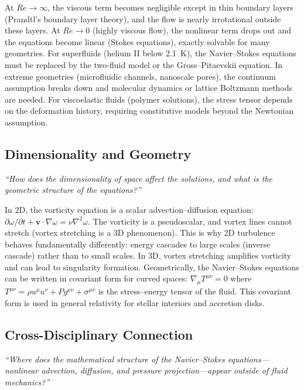 At $Re \to \infty$, the viscous term becomes negligible except in thin boundary layers (Prandtl's boundary layer theory), and the flow is nearly irrotational outside these layers. At $Re \to 0$ (highly viscous flow), the nonlinear term drops out and the equations become linear (Stokes equations), exactly solvable for many geometries. For superfluids (helium II below 2.1~K), the Navier--Stokes equations must be replaced by the two-fluid model or the Gross--Pitaevskii equation. In extreme geometries (microfluidic channels, nanoscale pores), the continuum assumption breaks down and molecular dynamics or lattice Boltzmann methods are needed. For viscoelastic fluids (polymer solutions), the stress tensor depends on the deformation history, requiring constitutive models beyond the Newtonian assumption.

\subsection*{Dimensionality and Geometry}
\textit{``How does the dimensionality of space affect the solutions, and what is the geometric structure of the equations?''}

In 2D, the vorticity equation is a scalar advection--diffusion equation: $\partial\omega/\partial t + \mathbf{v}\cdot\nabla\omega = \nu\nabla^{2}\omega$. The vorticity is a pseudoscalar, and vortex lines cannot stretch (vortex stretching is a 3D phenomenon). This is why 2D turbulence behaves fundamentally differently: energy cascades to large scales (inverse cascade) rather than to small scales. In 3D, vortex stretching amplifies vorticity and can lead to singularity formation. Geometrically, the Navier--Stokes equations can be written in covariant form for curved spaces: $\nabla_{\mu}T^{\mu\nu} = 0$ where $T^{\mu\nu} = \rho u^{\mu}u^{\nu} + Pg^{\mu\nu} + \sigma^{\mu\nu}$ is the stress--energy tensor of the fluid. This covariant form is used in general relativity for stellar interiors and accretion disks.

\subsection*{Cross-Disciplinary Connection}
\textit{``Where does the mathematical structure of the Navier--Stokes equations---nonlinear advection, diffusion, and pressure projection---appear outside of fluid mechanics?''}


